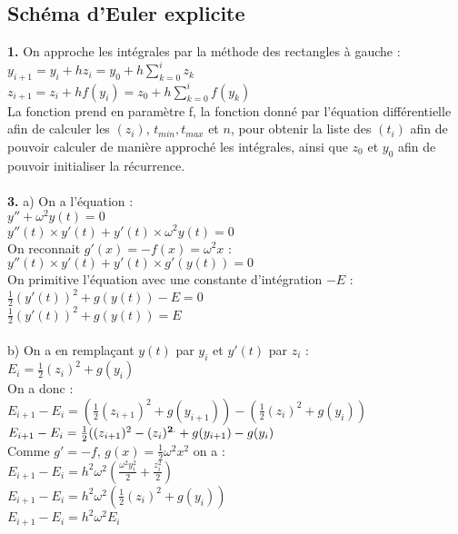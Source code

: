 \documentclass{article}
\begin{document}
\subsection{Schéma d'Euler explicite}
{\bf 1.} On approche les intégrales par la méthode des rectangles à gauche : \\
$y_{ i+1}=y_i + h z_i = y_0 + h\sum_{k=0}^{i}z_k $ \\
$z_{i+1}=z_i + h f(y_i)= z_0 + h\sum_{k=0}^{i} f(y_k) $ \\

La fonction prend en paramètre f, la fonction donné par l'équation différentielle afin de calculer les $(z_i)$, $t_{min}, t_{max}$ et $n$, pour obtenir la liste des $(t_i)$ afin de pouvoir calculer de manière approché les intégrales, ainsi que $z_0$ et $y_0$ afin de pouvoir initialiser la récurrence. \\
\\
{\bf 3.} a) On a l'équation : \\
$y''+ \omega^2y(t)=0$ \\
$y''(t) \times y'(t) + y'(t) \times \omega^2 y(t)=0$ \\
On reconnait $g'(x)=-f(x)=\omega^2x $ : \\
$y''(t) \times y'(t) + y'(t) \times g'(y(t))=0$ \\
On primitive l'équation avec une constante d'intégration $-E$ : \\
$\frac{1}{2} (y'(t))^2 + g(y(t))-E=0$ \\
$\frac{1}{2} (y'(t))^2 + g(y(t))=E$ \\
 \\
b) On a en remplaçant $y(t)$ par $y_i$ et $y'(t)$ par $z_i$ : \\
$E_i=\frac{1}{2} (z_i)^2 + g(y_i)$ \\
On a donc : \\
$E_{i+1}-E_i =(\frac{1}{2} (z_{i+1})^2 + g(y_{i+1}))-(\frac{1}{2} (z_i)^2 + g(y_i))$ \\
$E_{i+1}-E_i =\frac{1}{2} ((z_{i+1})^2-(z_i)^{\bf 2.} + g(y_{i+1})-g(y_i)$ \\
Comme $g'=-f$, $g(x)=\frac{1}{2} \omega^2 x^2$ on a : \\
$E_{i+1}-E_i = h^2 \omega^2 (\frac{\omega^2 y_i^2}{2}+\frac{z_i^2}{2})$ \\
$E_{i+1}-E_i =h^2 \omega^2 (\frac{1}{2} (z_i)^2 + g(y_i))$ \\
$E_{i+1}-E_i =h^2 \omega^2 E_i$ \\
 \\
\end{document}
